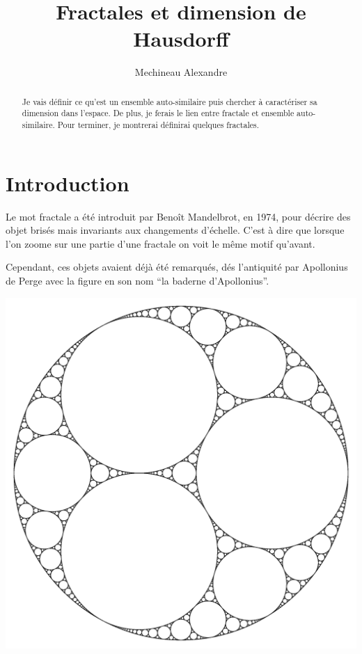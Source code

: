 \documentclass[a4paper, 12pt]{report}
\title{ \bf Fractales et dimension de Hausdorff}
\author{Mechineau Alexandre}
\begin{document}
	\newtheorem{definition}{Définition}
	\newtheorem{prop}{Proposition}
	\newtheorem{theorem}{Théorème}
	\newtheorem*{remark*}{Remarque}
	\newtheorem{lemma}{Lemme}
	
	
	\maketitle
	
	\begin{abstract}
		Je vais définir ce qu'est un ensemble auto-similaire puis chercher à caractériser sa dimension dans l'espace. De plus, je ferais le lien entre fractale et ensemble auto-similaire. Pour terminer, je montrerai définirai quelques fractales.
	\end{abstract}
	
	\tableofcontents
	
	\chapter{\bf Introduction}
		
		Le mot fractale a été introduit par Benoît Mandelbrot, en 1974, pour décrire des objet brisés mais invariants aux changements d'échelle. C'est à dire que lorsque l'on zoome sur une partie d'une fractale on voit le même motif qu'avant.
		
		Cependant, ces objets avaient déjà été remarqués, dés l'antiquité par Apollonius de Perge avec la figure en son nom ``la baderne d'Apollonius''.
		\begin{center}
			\includegraphics[scale=0.1]{Images/baderne}
		\end{center}
		
\end{document}
